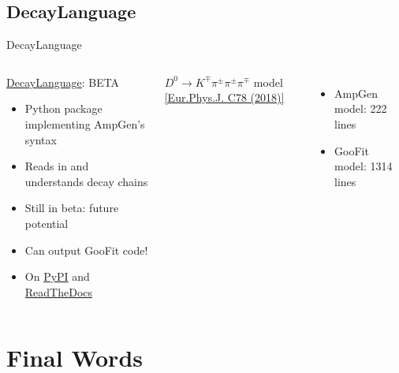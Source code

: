 \documentclass[aspectratio=169, smaller]{beamer}
\begin{document}
\subsection{DecayLanguage}
\begin{frame}{DecayLanguage}
    \begin{columns}[c]
        \begin{block}{\href{https://decaylanguage.readthedocs.io/en/latest/}{DecayLanguage}: BETA}
            \begin{itemize}
                \item Python package implementing AmpGen's syntax
                \item Reads in and understands decay chains
                \item Still in beta: future potential
                \item Can output GooFit code!
                \item On \href{https://pypi.org/project/decaylanguage/}{PyPI} and \href{https://decaylanguage.readthedocs.io/en/latest/}{ReadTheDocs}
            \end{itemize}
        \end{block}
        $D^0\rightarrow K^{\mp} \pi^{\pm} \pi^{\pm} \pi^{\mp}$ model \href{https://inspirehep.net/record/1644791}{[Eur.Phys.J. C78 (2018)]}
        
        \begin{itemize}
            \item AmpGen model: 222 lines
            \item GooFit model: 1314 lines
        \end{itemize}
    \end{columns}
\end{frame}

\section{Final Words}
\end{document}
